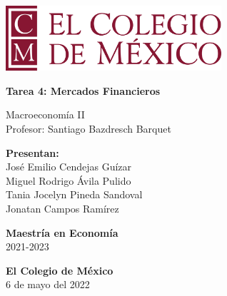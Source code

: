 \begin{titlepage}
   \begin{center}
       \vspace*{1cm}
      
        \includegraphics[width=0.6\textwidth]{COLMEX.png}
        
        \vspace*{1cm}

       \textbf{Tarea 4: Mercados Financieros}

       \vspace{0.5cm}
        Macroeconomía II \\
        \vspace{0.5cm}
        Profesor: Santiago Bazdresch Barquet
            
       \vspace{1.5cm}

       \textbf{Presentan:} \\
       \vspace{0.5cm}
       José Emilio Cendejas Guízar\\ 
       Miguel Rodrigo Ávila Pulido\\ 
       Tania Jocelyn Pineda Sandoval\\
       Jonatan Campos Ramírez
       
       

       \vspace{3cm}
            
      \textbf{Maestría en Economía}\\
       2021-2023
            
       \vspace{0.8cm}
     
            
       \textbf{El Colegio de México}\\
       6 de mayo del 2022
            
   \end{center}
\end{titlepage}